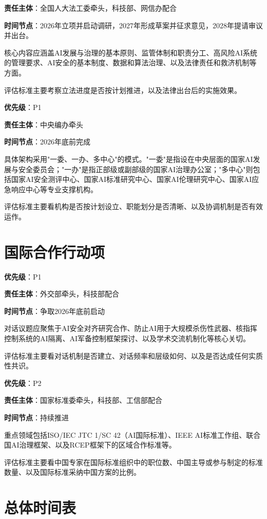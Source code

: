 \textbf{责任主体}：全国人大法工委牵头，科技部、网信办配合

\textbf{时间节点}：2026年立项并启动调研，2027年形成草案并征求意见，2028年提请审议并出台。

核心内容应涵盖AI发展与治理的基本原则、监管体制和职责分工、高风险AI系统的管理要求、AI安全的基本制度、数据和算法治理、以及法律责任和救济机制等方面。

评估标准主要考察立法进度是否按计划推进，以及法律出台后的实施效果。

\textbf{优先级}：P1

\textbf{责任主体}：中央编办牵头

\textbf{时间节点}：2026年底前完成

具体架构采用"一委、一办、多中心"的模式。"一委"是指设在中央层面的国家AI发展与安全委员会；"一办"是指正部级或副部级的国家AI治理办公室；"多中心"则包括国家AI安全测评中心、国家AI标准研究中心、国家AI伦理研究中心、国家AI应急响应中心等专业支撑机构。

评估标准主要看机构是否按计划设立、职能划分是否清晰、以及协调机制是否有效运作。

\section{国际合作行动项}

\textbf{优先级}：P1

\textbf{责任主体}：外交部牵头，科技部配合

\textbf{时间节点}：争取2026年底前启动

对话议题应聚焦于AI安全对齐研究合作、防止AI用于大规模杀伤性武器、核指挥控制系统的AI隔离、AI军备控制框架探讨、以及学术交流机制化等核心关切。

评估标准主要看对话机制是否建立、对话频率和层级如何、以及是否达成任何实质性共识。

\textbf{优先级}：P2

\textbf{责任主体}：国家标准委牵头，科技部、工信部配合

\textbf{时间节点}：持续推进

重点领域包括ISO/IEC JTC 1/SC 42（AI国际标准）、IEEE AI标准工作组、联合国AI治理框架、以及RCEP框架下的区域合作标准等。

评估标准主要看中国专家在国际标准组织中的职位数、中国主导或参与制定的标准数量、以及国际标准采纳中国方案的比例。

\section{总体时间表}

